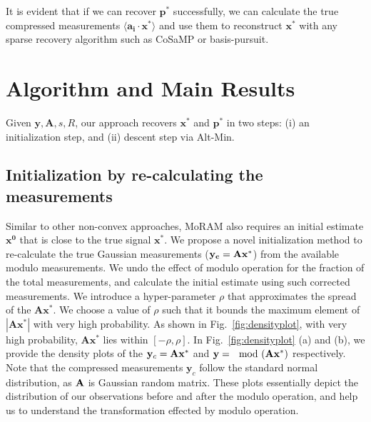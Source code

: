 It is evident that if we can recover $\mathbf{p^*}$ successfully, we can calculate the true compressed measurements $\langle \mathbf{a_i} \cdot \mathbf{x^*} \rangle$ and use them to reconstruct $\mathbf{x^*}$ with any sparse recovery algorithm such as CoSaMP or basis-pursuit.

\section{Algorithm and Main Results}
Given $\mathbf{y, A}, s, R$, our approach recovers $\mathbf{x^*}$ and $\mathbf{p^*}$ in two steps: (i) an initialization step, and (ii) descent step via Alt-Min.

\subsection{Initialization by re-calculating the measurements}
\label{sec:init}	
Similar to other non-convex approaches, MoRAM also requires an initial estimate $\mathbf{{x}^0}$ that is close to the true signal $\mathbf{{x}^*}$. We propose a novel initialization method to re-calculate the true Gaussian measurements ($\mathbf{y_c}= \mathbf{Ax^*}$) from the available modulo measurements. We undo the effect of modulo operation for the fraction of the total measurements, and calculate the initial estimate using such corrected measurements.
We introduce a hyper-parameter $\rho$ that approximates the spread of the $\mathbf{Ax^*}$. We choose a value of $\rho$ such that it bounds the maximum element of $|\mathbf{Ax^*}|$ with very high probability. As shown in Fig.~\ref{fig:densityplot}, with very high probability, $\mathbf{Ax^*}$ lies within $[-\rho, \rho]$.
In Fig.~\ref{fig:densityplot} (a) and (b), we provide the density plots of the $\mathbf{y}_c = \mathbf{Ax^*}$ and $\mathbf{y} = \mathbf{\mod(\mathbf{Ax^*})}$ respectively. Note that the compressed measurements $\mathbf{y}_c$ follow the standard normal distribution, as $\mathbf{A}$ is Gaussian random matrix. These plots essentially depict the distribution of our observations before and after the modulo operation, and help us to understand the transformation effected by modulo operation. %

